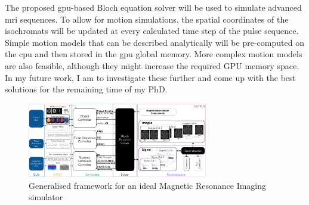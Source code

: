 \hfill

The proposed \ac{gpu}-based Bloch equation solver will be used to simulate advanced \ac{mri} sequences.
To allow for motion simulations, the spatial coordinates of the isochromats will be updated at every calculated time step of the pulse sequence.
Simple motion models that can be described analytically will be pre-computed on the \ac{cpu} and then stored in the \ac{gpu} global memory.
More complex motion models are also feasible, although they might increase the required GPU memory space.
In my future work, I am to investigate these further and come up with the best solutions for the remaining time of my PhD.


\begin{figure}[ht]
    \centering
    \includegraphics[angle=90,width=0.7\textwidth, keepaspectratio]{images/mri/globalFramework}
    \caption{Generalised framework for an ideal Magnetic Resonance Imaging simulator}
    \label{fig:globalFramework}
\end{figure}